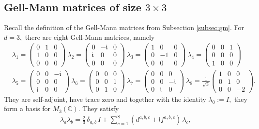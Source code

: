 \documentclass[12pt,dvipsnames,accepted=2016-08-18,a4paper,onecolumn]{quantumarticle}
\numberwithin{equation}{section}
\newcommand{\CC}{\mathbb C}
\theoremstyle{definition}
\begin{document}
\subsection{Gell-Mann matrices of size $3 \times 3$}\label{subsec: gm3}
Recall the definition of the Gell-Mann matrices from Subsection \ref{subsec:gm}. For $d=3,$ there are eight Gell-Mann matrices, namely
\begin{align*}
	&\lambda_1=
	\begin{pmatrix}
		0&1&0\\ 1&0&0 \\ 0&0&0
	\end{pmatrix} \ 
 \lambda_2 = 
 \begin{pmatrix}
 	0&-\mathfrak{i}&0\\ \mathfrak{i}&0&0 \\ 0&0&0
 \end{pmatrix}\ 
\lambda_3 = 
\begin{pmatrix}
	1&0&0\\ 0&-1&0 \\ 0&0&0
\end{pmatrix} \  
\lambda_4 = 
\begin{pmatrix}
	0&0&1\\ 0&0&0 \\ 1&0&0
\end{pmatrix} \\
&\lambda_5 = 
\begin{pmatrix}
	0&0&-\mathfrak{i}\\ 0&0&0 \\ \mathfrak{i}&0&0
\end{pmatrix}\ 
\lambda_6 = 
\begin{pmatrix}
	0&0&0\\ 0&0&1 \\ 0&1&0
\end{pmatrix}\ 
\lambda_7 = 
\begin{pmatrix}
	0&0&0\\ 0&0&-\mathfrak{i} \\ 0&\mathfrak{i}&0
\end{pmatrix}\ 
\lambda_8 = \frac{1}{\sqrt{3}}
\begin{pmatrix}
	1&0&0\\ 0&1&0 \\ 0&0&-2
\end{pmatrix}.
\end{align*}
They are self-adjoint, have trace zero and together with the identity $\lambda_0 := I,$ they form a basis for $M_3(\CC).$ They satisfy
\begin{align}\label{eq: lambda x}
	\lambda_a \lambda_b = \frac{2}{3}\, \delta_{a,b}\,I + \sum_{c=1}^8 (d^{a,b,c} + \mathfrak{i}f^{a,b,c}) \, \lambda_c, 
\end{align}
\end{document}
